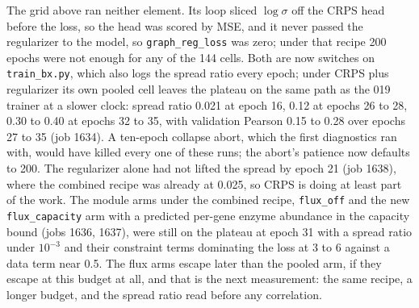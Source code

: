 The grid above ran neither element. Its loop sliced $\log\sigma$ off the CRPS head before
the loss, so the head was scored by MSE, and it never passed the regularizer to the model,
so \texttt{graph\_reg\_loss} was zero; under that recipe 200 epochs were not enough for any
of the 144 cells. Both are now switches on \texttt{train\_bx.py}, which also logs the spread
ratio every epoch; under CRPS plus regularizer its own pooled cell leaves the plateau on
the same path as the 019 trainer at a slower clock: spread ratio 0.021 at epoch 16, 0.12 at
epochs 26 to 28, 0.30 to 0.40 at epochs 32 to 35, with validation Pearson 0.15 to 0.28 over
epochs 27 to 35 (job 1634). A ten-epoch collapse abort, which the first diagnostics ran
with, would have killed every one of these runs; the abort's patience now defaults to 200.
The regularizer alone had not lifted the spread by epoch 21 (job 1638), where the combined
recipe was already at 0.025, so CRPS is doing at least part of the work. The module arms
under the combined recipe, \texttt{flux\_off} and the new \texttt{flux\_capacity} arm with a
predicted per-gene enzyme abundance in the capacity bound (jobs 1636, 1637), were still on
the plateau at epoch 31 with a spread ratio under $10^{-3}$ and their constraint terms
dominating the loss at 3 to 6 against a data term near 0.5. The flux arms escape later than
the pooled arm, if they escape at this budget at all, and that is the next measurement: the
same recipe, a longer budget, and the spread ratio read before any correlation.
